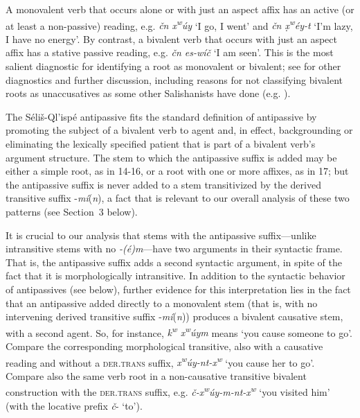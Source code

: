\documentclass[output=paper,colorlinks,citecolor=brown]{langscibook}
\begin{document}
A monovalent verb that occurs alone or with just an aspect affix has
an active (or at least a non-passive) reading, e.g. \emph{\v{c}n
 x\textsuperscript w\'uy} `I go, I went' and \emph{\v{c}n
 \d{x}\textsuperscript w\'ey-t} `I'm lazy, I have no energy'.  By
contrast, a bivalent verb that occurs with just an aspect affix has a
stative passive reading, e.g. \emph{\v{c}n es-w\'i\v{c}} `I am seen'.
This is the most salient diagnostic for identifying a root as
monovalent or bivalent; see \cite{S.Thomasonetal.:1994} for other diagnostics
and further discussion, including reasons for not classifying bivalent
roots as unaccusatives as some other Salishanists have done
(e.g. \cite{Gerdts:1991}).


The S\'eli\v{s}-Ql'isp\'e antipassive fits the standard definition of
antipassive by promoting the subject of a bivalent verb to agent and,
in effect, backgrounding or eliminating the lexically specified
patient that is part of a bivalent verb's argument structure.  The
stem to which the antipassive suffix is added may be either a simple
root, as in 14-16, or a root with one or more affixes, as in 17; but
the antipassive suffix is never added to a stem transitivized by the
derived transitive suffix -\emph{m\'i}(\emph{n}), a fact that is
relevant to our overall analysis of these two patterns (see Section~3
below).


It is crucial to our analysis that stems with the antipassive
suffix---unlike intransitive stems with no \emph{-(\'e)m}---have two
arguments in their syntactic frame.  That is, the antipassive suffix
adds a second syntactic argument, in spite of the fact that it is
morphologically intransitive.  In addition to the syntactic behavior
of antipassives (see below), further evidence for this interpretation
lies in the fact that an antipassive added directly to a monovalent
stem (that is, with no intervening derived transitive suffix -\emph{m\'i}(\emph{n})) produces a bivalent causative stem, with a second
agent.  So, for instance, \emph{{k\textsuperscript w} x\textsuperscript
 w\'uym} means `you cause someone to go'.  Compare the corresponding
morphological transitive, also with a causative reading and without a
\textsc{der.trans} suffix, \emph{x\textsuperscript
 w\'uy-nt-x\textsuperscript w} `you cause her to go'.  Compare also the
same verb root in a non-causative transitive bivalent construction
with the \textsc{der.trans} suffix, e.g. \emph{\v{c}-x\textsuperscript
 w\'uy-m-nt-x\textsuperscript w} `you visited him' (with the locative
prefix \emph{\v{c}}- `to').
\end{document}
